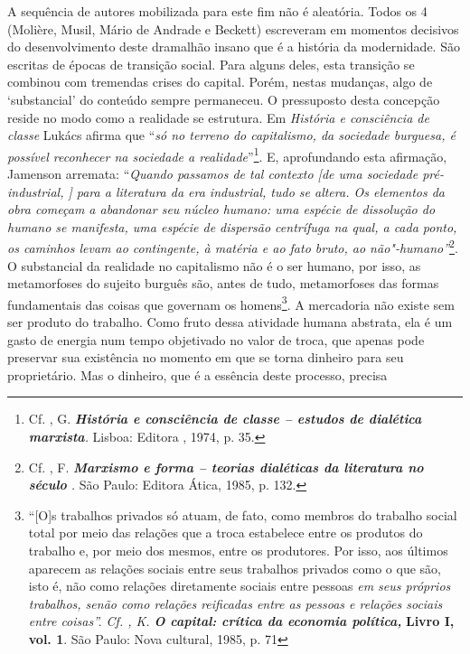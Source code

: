 A sequência de autores mobilizada para este fim não é aleatória. Todos
os 4 (Molière, Musil, Mário de Andrade e Beckett) escreveram em momentos
decisivos do desenvolvimento deste dramalhão insano que é a história da
modernidade. São escritas de épocas de transição social. Para alguns
deles, esta transição se combinou com tremendas crises do capital.
Porém, nestas mudanças, algo de `substancial' do conteúdo sempre
permaneceu. O pressuposto desta concepção reside no modo como a
realidade se estrutura. Em \emph{História e consciência de classe}
Lukács afirma que ``\emph{só no terreno do capitalismo, da sociedade
burguesa, é possível reconhecer na sociedade a realidade}''\footnote{Cf.
  , G. \emph{\textbf{História e consciência de classe -- estudos
  de dialética marxista}.} Lisboa: Editora , 1974, p. 35.}. E,
aprofundando esta afirmação, Jamenson arremata: ``\emph{Quando passamos
de tal contexto [de uma sociedade pré-industrial, ] para a
literatura da era industrial, tudo se altera. Os elementos da obra
começam a abandonar seu núcleo humano: uma espécie de dissolução do
humano se manifesta, uma espécie de dispersão centrífuga na qual, a cada
ponto, os caminhos levam ao contingente, à matéria e ao fato bruto, ao
não"-humano''}\footnote{Cf. , F. \emph{\textbf{Marxismo e forma --
  teorias dialéticas da literatura no século }.} São Paulo: Editora
  Ática, 1985, p. 132.}. O substancial da realidade no capitalismo não é
o ser humano, por isso, as metamorfoses do sujeito burguês são, antes de
tudo, metamorfoses das formas fundamentais das coisas que governam os
homens\footnote{``[O]s trabalhos privados só atuam, de fato, como
  membros do trabalho social total por meio das relações que a troca
  estabelece entre os produtos do trabalho e, por meio dos mesmos, entre
  os produtores. Por isso, aos últimos aparecem as relações sociais
  entre seus trabalhos privados como o que são, isto é, não como
  relações diretamente sociais entre pessoas \emph{em seus próprios
  trabalhos, senão como relações reificadas entre as pessoas e relações
  sociais entre coisas''. Cf. , K. \textbf{O capital: crítica da
  economia política, }}\textbf{Livro I, vol. 1}. São Paulo: Nova
  cultural, 1985, p. 71}. A mercadoria não existe sem ser produto do
trabalho. Como fruto dessa atividade humana abstrata, ela é um gasto de
energia num tempo objetivado no valor de troca, que apenas pode
preservar sua existência no momento em que se torna dinheiro para seu
proprietário. Mas o dinheiro, que é a essência deste processo, precisa
